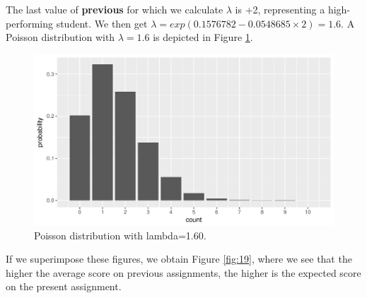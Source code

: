 \documentclass[]{report}\usepackage[]{graphicx}\usepackage[]{color}
\makeatletter
\def\maxwidth{ %
  \ifdim\Gin@nat@width>\linewidth
    \linewidth
  \else
    \Gin@nat@width
  \fi
}
\newenvironment{knitrout}{}{} %
\makeatother
\begin{document}
The last value of \textbf{previous} for which we calculate $\lambda$ is +2, representing a high-performing student. We then get $\lambda=exp(0.1576782  -0.0548685 \times 2)= 1.6$. A Poisson distribution with $\lambda=1.6$ is depicted in Figure \ref{fig:gen_18}.

\begin{knitrout}
\color{fgcolor}\begin{figure}

{\centering \includegraphics[width=\maxwidth]{figure/gen_18-1} 

}

\caption[Poisson distribution with lambda=1.60]{Poisson distribution with lambda=1.60.}\label{fig:gen_18}
\end{figure}


\end{knitrout}


If we superimpose these figures, we obtain Figure \ref{fig:19}, where we see that the higher the average score on previous assignments, the higher is the expected score on the present assignment.
\end{document}
